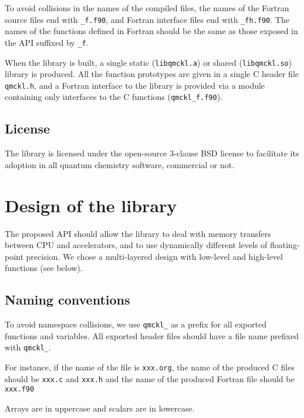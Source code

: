 To avoid collisions in the names of the compiled files, the names of
the Fortran source files end with \texttt{_f.f90}, and Fortran
interface files end with \texttt{_fh.f90}.
The names of the functions defined in Fortran should be the
same as those exposed in the \ac{API} suffixed by \texttt{_f}.

When the library is built, a single static
(\texttt{libqmckl.a}) or shared
(\texttt{libqmckl.so}) library is produced. All the
function prototypes are given in a single C header file
\texttt{qmckl.h}, and a Fortran interface to the library is
provided via a module containing only interfaces to the C functions
(\texttt{qmckl_f.f90}).

\subsection{License}

The library is licensed under the open-source 3-clause BSD license to facilitate
its adoption in all quantum chemistry software, commercial or not.


\section{Design of the library}

The proposed \ac{API} should allow the library to deal with memory
transfers between CPU and accelerators, and to use dynamically
different levels of floating-point precision.  We chose a
multi-layered design with low-level and high-level functions (see
below).

\subsection{Naming conventions}

To avoid namespace collisions, we use \texttt{qmckl_} as a prefix for
all exported functions and variables.  All exported header files
should have a file name prefixed with \texttt{qmckl_}.

For instance, if the name of the {\orgmode} file is
\texttt{xxx.org}, the name of the produced C files should
be \texttt{xxx.c} and \texttt{xxx.h} and the
name of the produced Fortran file should be
\texttt{xxx.f90}

Arrays are in uppercase and scalars are in lowercase.

